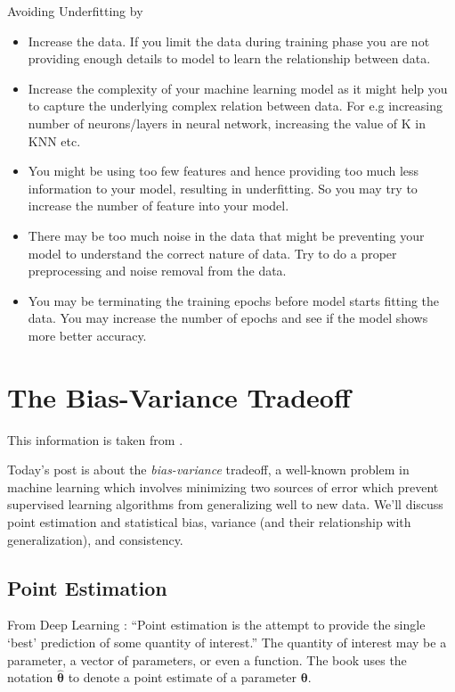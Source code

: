 Avoiding Underfitting by
\begin{itemize}
\item Increase the data. If you limit the data during training phase you are not providing enough details to model to learn the relationship between data.

\item Increase the complexity of your machine learning model as it might help you to capture the underlying complex relation between data. For e.g increasing number of neurons/layers in neural network, increasing the value of K in KNN etc.

\item You might be using too few features and hence providing too much less information to your model, resulting in underfitting. So you may try to increase the number of feature into your model.

\item  There may be too much noise in the data that might be preventing your model to understand the correct nature of data. Try to do a proper preprocessing and noise removal from the data.

\item  You may be terminating the training epochs before model starts fitting the data. You may increase the number of epochs and see if the model shows more better accuracy.
\end{itemize}






\section{The Bias-Variance Tradeoff}
\label{sec:Regularization}

This information is taken from \cite{DanielSaunders2017}.

Today's post is about the \textit{bias-variance} tradeoff, a well-known problem in machine learning which involves minimizing two sources of error which prevent supervised learning algorithms from generalizing well to new data. We'll discuss point estimation and statistical bias, variance (and their relationship with generalization), and consistency.

\subsection{Point Estimation}

From Deep Learning \cite{Goodfellow2016}: ``Point estimation is the attempt to provide the single `best' prediction of some quantity of interest.'' The quantity of interest may be a parameter, a vector of parameters, or even a function. The book uses the notation $\boldsymbol{\hat{\theta}}$ to denote a point estimate of a parameter $\boldsymbol{\theta}$.



